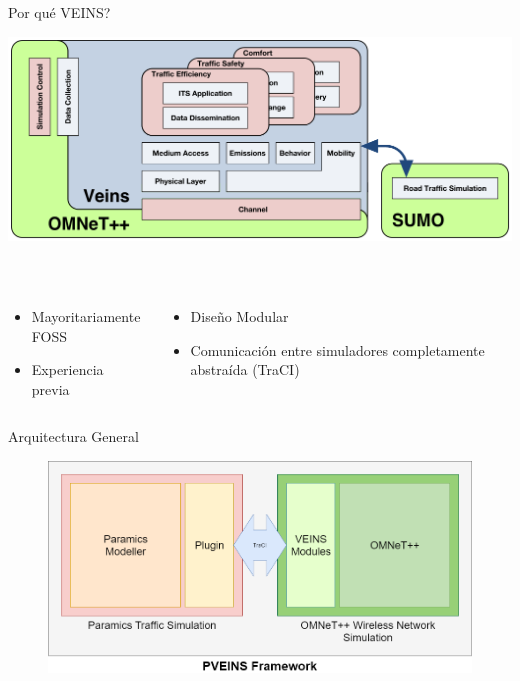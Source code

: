 \documentclass[aspectratio=169]{beamer}
\begin{document}
\begin{frame}{Por qué VEINS?}
\vspace{\belowdisplayskip}
\begin{minipage}{\linewidth}
    \centering
    \includegraphics[width=.8\linewidth]{figuras/veins-arch.png}
\end{minipage}\\
\vspace{\belowdisplayskip}\pause
\begin{minipage}{\linewidth}
    \begin{columns}
        \begin{column}{.5\linewidth}
            \begin{itemize}
                \item Mayoritariamente FOSS\pause
                \item Experiencia previa\pause
            \end{itemize}
        \end{column}
        \begin{column}{.5\linewidth}
            \begin{itemize}
                \item Diseño Modular\pause
                \item Comunicación entre simuladores completamente abstraída (TraCI)
            \end{itemize}
        \end{column}
    \end{columns}
\end{minipage}
\end{frame}

\begin{frame}{Arquitectura General}
\begin{figure}
    \centering
    \includegraphics[width=\linewidth]{figuras/PVEINSArch.png}
\end{figure}
\end{frame}
\end{document}
